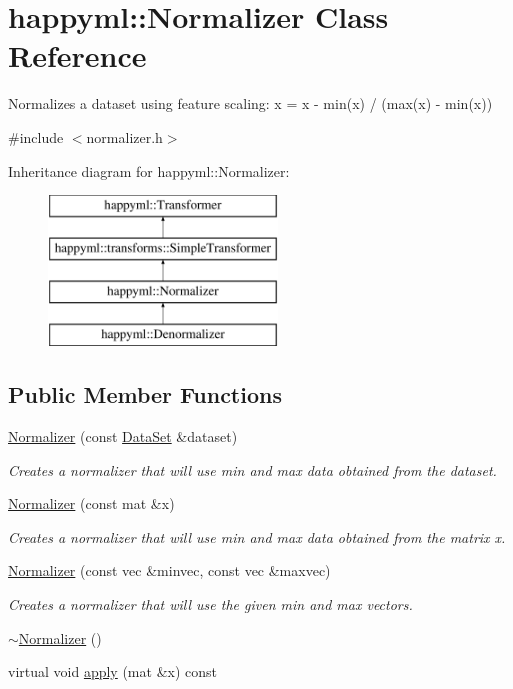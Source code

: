 \hypertarget{classhappyml_1_1Normalizer}{}\section{happyml\+:\+:Normalizer Class Reference}
\label{classhappyml_1_1Normalizer}


Normalizes a dataset using feature scaling\+: x\textquotesingle{} = x -\/ min(x) / (max(x) -\/ min(x))  




{\ttfamily \#include $<$normalizer.\+h$>$}

Inheritance diagram for happyml\+:\+:Normalizer\+:\begin{figure}[H]
\begin{center}
\leavevmode
\includegraphics[height=4.000000cm]{classhappyml_1_1Normalizer}
\end{center}
\end{figure}
\subsection*{Public Member Functions}
\begin{DoxyCompactItemize}
\item 
\hyperlink{classhappyml_1_1Normalizer_af077d001899fed09a9abf17bf25e8024}{Normalizer} (const \hyperlink{classhappyml_1_1DataSet}{Data\+Set} \&dataset)
\begin{DoxyCompactList}\small\item\em Creates a normalizer that will use min and max data obtained from the dataset. \end{DoxyCompactList}\item 
\hyperlink{classhappyml_1_1Normalizer_a89b2ff31096640780e5232b73600b267}{Normalizer} (const mat \&x)
\begin{DoxyCompactList}\small\item\em Creates a normalizer that will use min and max data obtained from the matrix x. \end{DoxyCompactList}\item 
\hyperlink{classhappyml_1_1Normalizer_aa8a09a8e4f7ebe0cedc09fb5c2114841}{Normalizer} (const vec \&minvec, const vec \&maxvec)
\begin{DoxyCompactList}\small\item\em Creates a normalizer that will use the given min and max vectors. \end{DoxyCompactList}\item 
\hyperlink{classhappyml_1_1Normalizer_ac478c1302d6e3b66237af985e44265d2}{$\sim$\+Normalizer} ()
\item 
virtual void \hyperlink{classhappyml_1_1Normalizer_aeff0b4e117d69311cc5845c9915fa691}{apply} (mat \&x) const 
\end{DoxyCompactItemize}
